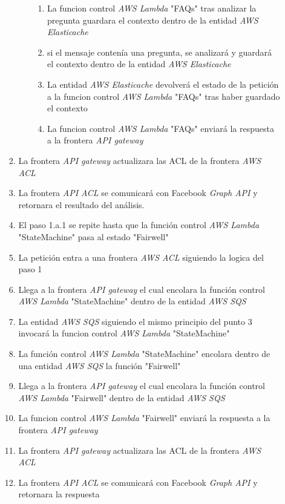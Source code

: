 \begin{enumerate}
\begin{enumerate}
\begin{enumerate}
\begin{enumerate}
\begin{enumerate}
                            \item La funcion control \textit{AWS Lambda} "FAQs" tras analizar la pregunta guardara el contexto dentro de la entidad \textit{AWS Elasticache}
                            \item si el mensaje contenía una pregunta, se analizará y guardará el contexto dentro de la entidad \textit{AWS Elasticache}
                            \item La entidad \textit{AWS Elasticache} devolverá el estado de la petición a la funcion control \textit{AWS Lambda} "FAQs" tras haber guardado el contexto
                            \item La funcion control \textit{AWS Lambda} "FAQs" enviará la respuesta a la frontera \textit{API gateway}
                        \end{enumerate}
                    \end{enumerate}
                    \item La frontera \textit{API gateway} actualizara las ACL de la frontera \textit{AWS ACL}
                    \item La frontera \textit{API ACL} se comunicará con Facebook \textit{Graph API} y retornara el resultado del análisis.
                    \item El paso 1.a.1 se repite hasta que la función control \textit{AWS Lambda} "StateMachine" pasa al estado "Fairwell"
                    \item La petición entra a una frontera \textit{AWS ACL} siguiendo la logica del paso 1
                    \item Llega a la frontera \textit{API gateway} el cual encolara la función control \textit{AWS Lambda} "StateMachine" dentro de la entidad \textit{AWS SQS}
                    \item La entidad \textit{AWS SQS} siguiendo el mismo principio del punto 3 invocará la funcion control \textit{AWS Lambda} "StateMachine"
                    \item La función control \textit{AWS Lambda} "StateMachine" encolara dentro de una entidad \textit{AWS SQS} la función "Fairwell"
                    \item Llega a la frontera \textit{API gateway} el cual encolara la función control \textit{AWS Lambda} "Fairwell" dentro de la entidad \textit{AWS SQS}
                     \item La funcion control \textit{AWS Lambda} "Fairwell" enviará la respuesta a la frontera \textit{API gateway}
                     \item La frontera \textit{API gateway} actualizara las ACL de la frontera \textit{AWS ACL}
                    \item La frontera \textit{API ACL} se comunicará con Facebook \textit{Graph API} y retornara la respuesta
                \end{enumerate}
            \end{enumerate}



\end{enumerate}
